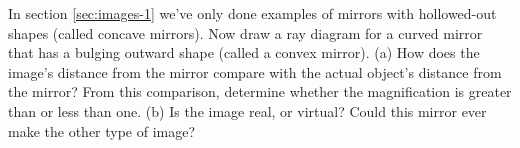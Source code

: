 In section \ref{sec:images-1} we've only done examples of mirrors with
hollowed-out shapes (called concave mirrors). Now draw a ray
diagram for a curved mirror that has a bulging outward shape
(called a convex mirror). (a) How does the image's distance
from the mirror compare with the actual object's distance
from the mirror? From this comparison, determine whether the
magnification is greater than or less than one. (b) Is the
image real, or virtual? Could this mirror ever make the
other type of image?

